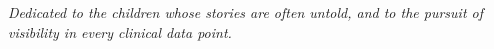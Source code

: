 \chapter*{}
\begin{center}
    \textit{Dedicated to the children whose stories are often untold, and to the pursuit of visibility in every clinical data point.}
\end{center}
